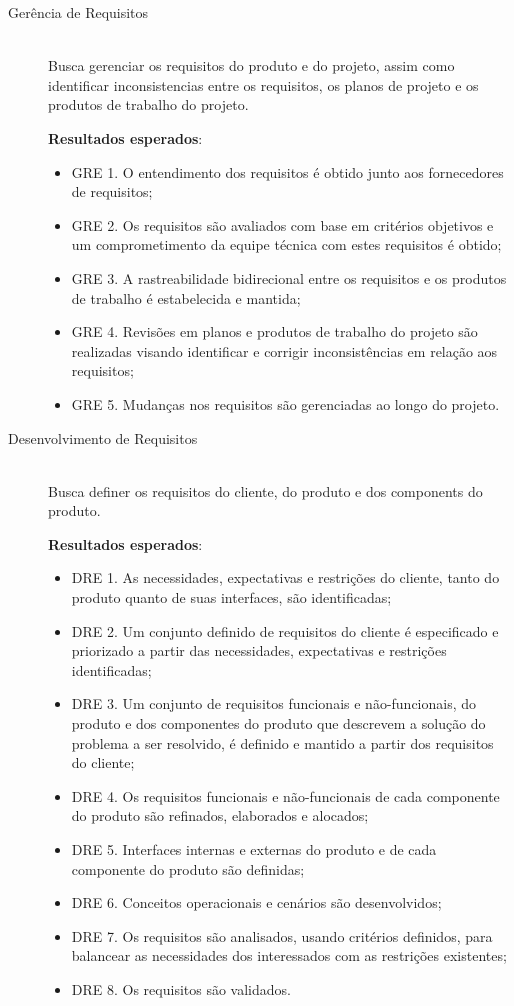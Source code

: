 \begin{description}
  \item[Gerência de Requisitos] \hfill \\
  Busca gerenciar os requisitos do produto e do projeto, assim como identificar
  inconsistencias entre os requisitos, os planos de projeto e os produtos de trabalho do projeto.

  \textbf{Resultados esperados}:
  \begin{itemize}
  \item  GRE 1. O entendimento dos requisitos é obtido junto aos fornecedores de requisitos;
  \item  GRE 2. Os requisitos são avaliados com base em critérios objetivos e um comprometimento da equipe técnica com estes requisitos é obtido;
  \item  GRE 3. A rastreabilidade bidirecional entre os requisitos e os produtos de trabalho é estabelecida e mantida;
  \item  GRE 4. Revisões em planos e produtos de trabalho do projeto são realizadas visando identificar e corrigir inconsistências em relação aos requisitos;
  \item  GRE 5. Mudanças nos requisitos são gerenciadas ao longo do projeto.
\end{itemize}


  \item[Desenvolvimento de Requisitos] \hfill \\
  Busca definer os requisitos do cliente, do produto e dos components do produto.

  \textbf{Resultados esperados}:
  \begin{itemize}
\item  DRE 1. As necessidades, expectativas e restrições do cliente, tanto do produto quanto de suas interfaces, são identificadas;
\item  DRE 2. Um conjunto definido de requisitos do cliente é especificado e priorizado a partir das necessidades, expectativas e restrições identificadas;
\item  DRE 3. Um conjunto de requisitos funcionais e não-funcionais, do produto e dos componentes do produto que descrevem a solução do problema a ser resolvido, é definido e mantido a partir dos requisitos do cliente;
\item  DRE 4. Os requisitos funcionais e não-funcionais de cada componente do produto são refinados, elaborados e alocados;
\item  DRE 5. Interfaces internas e externas do produto e de cada componente do produto são definidas;
\item  DRE 6. Conceitos operacionais e cenários são desenvolvidos;
\item  DRE 7. Os requisitos são analisados, usando critérios definidos, para balancear as necessidades dos interessados com as restrições existentes;
\item  DRE 8. Os requisitos são validados.
\end{itemize}

\end{description}

